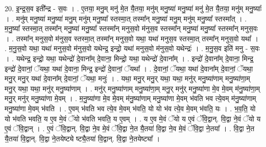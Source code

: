 \documentclass[17pt]{extarticle}
\begin{document}
20. इ॒न्द्र॒स॒व इती᳚न्द्र - स॒वः । . ए॒तया॒ मनु॒म् मनु॑ मे॒त यै॒तया॒ मनु॑म् मनु॒ष्या॑ मनु॒ष्या॑ मनु॑ मे॒त यै॒तया॒ मनु॑म् मनु॒ष्याः᳚ । . मनु॑म् मनु॒ष्या॑ मनु॒ष्या॑ मनु॒म् मनु॑म् मनु॒ष्या᳚ स्तस्मा॒त् तस्मा᳚न् मनु॒ष्या॑ मनु॒म् मनु॑म् मनु॒ष्या᳚ स्तस्मा᳚त् । . म॒नु॒ष्या᳚ स्तस्मा॒त् तस्मा᳚न् मनु॒ष्या॑ मनु॒ष्या᳚ स्तस्मा᳚न् मनुस॒वो म॑नुस॒व स्तस्मा᳚न् मनु॒ष्या॑ मनु॒ष्या᳚ स्तस्मा᳚न् मनुस॒वः । . तस्मा᳚न् मनुस॒वो म॑नुस॒व स्तस्मा॒त् तस्मा᳚न् मनुस॒वो यथा॒ यथा॑ मनुस॒व स्तस्मा॒त् तस्मा᳚न् मनुस॒वो यथा᳚ । . म॒नु॒स॒वो यथा॒ यथा॑ मनुस॒वो म॑नुस॒वो यथेन्द्र॒ इन्द्रो॒ यथा॑ मनुस॒वो म॑नुस॒वो यथेन्द्रः॑ । . म॒नु॒स॒व इति॑ मनु - स॒वः । . यथेन्द्र॒ इन्द्रो॒ यथा॒ यथेन्द्रो॑ दे॒वाना᳚म् दे॒वाना॒ मिन्द्रो॒ यथा॒ यथेन्द्रो॑ दे॒वाना᳚म् । . इन्द्रो॑ दे॒वाना᳚म् दे॒वाना॒ मिन्द्र॒ इन्द्रो॑ दे॒वानां॒ ॅयथा॒ यथा॑ दे॒वाना॒ मिन्द्र॒ इन्द्रो॑ दे॒वानां॒ ॅयथा᳚ । . दे॒वानां॒ ॅयथा॒ यथा॑ दे॒वाना᳚म् दे॒वानां॒ ॅयथा॒ मनु॒र् मनु॒र् यथा॑ दे॒वाना᳚म् दे॒वानां॒ ॅयथा॒ मनुः॑ । . यथा॒ मनु॒र् मनु॒र् यथा॒ यथा॒ मनु॑र् मनु॒ष्या॑णाम् मनु॒ष्या॑णा॒म् मनु॒र् यथा॒ यथा॒ मनु॑र् मनु॒ष्या॑णाम् । . मनु॑र् मनु॒ष्या॑णाम् मनु॒ष्या॑णा॒म् मनु॒र् मनु॑र् मनु॒ष्या॑णा मे॒व मे॒वम् म॑नु॒ष्या॑णा॒म् मनु॒र् मनु॑र् मनु॒ष्या॑णा मे॒वम् । . म॒नु॒ष्या॑णा मे॒व मे॒वम् म॑नु॒ष्या॑णाम् मनु॒ष्या॑णा मे॒वम् भ॑वति भव त्ये॒वम् म॑नु॒ष्या॑णाम् मनु॒ष्या॑णा मे॒वम् भ॑वति । . ए॒वम् भ॑वति भव त्ये॒व मे॒वम् भ॑वति॒ यो यो भ॑व त्ये॒व मे॒वम् भ॑वति॒ यः । . भ॒व॒ति॒ यो यो भ॑वति भवति॒ य ए॒व मे॒वं ॅयो भ॑वति भवति॒ य ए॒वम् । . य ए॒व मे॒वं ॅयो य ए॒वं ॅवि॒द्वान्. वि॒द्वा ने॒वं ॅयो य ए॒वं ॅवि॒द्वान् । . ए॒वं ॅवि॒द्वान्. वि॒द्वा ने॒व मे॒वं ॅवि॒द्वा ने॒त यै॒तया॑ वि॒द्वा ने॒व मे॒वं ॅवि॒द्वा ने॒तया᳚ । . वि॒द्वा ने॒त यै॒तया॑ वि॒द्वान्. वि॒द्वा ने॒तयेष्ट्ये ष्ट्यै॒तया॑ वि॒द्वान्. वि॒द्वा ने॒तयेष्ट्या᳚ । \newline
\end{document}
